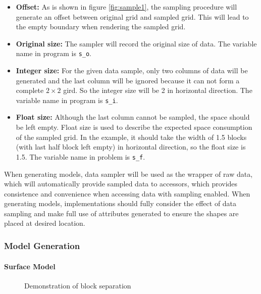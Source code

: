 \begin{itemize}
	\item \textbf{Offset:} As is shown in figure \ref{fig:sample1}, the sampling procedure will generate an offset between original grid and sampled grid. This will lead to the empty boundary when rendering the sampled grid.
	\item \textbf{Original size:} The sampler will record the original size of data. The variable name in program is \lstinline{s_o}.
	\item \textbf{Integer size:} For the given data sample, only two columns of data will be generated and the last column will be ignored because it can not form a complete $2\times2$ gird. So the integer size will be 2 in horizontal direction. The variable name in program is \lstinline{s_i}.
	\item \textbf{Float size:} Although the last column cannot be sampled, the space should be left empty. Float size is used to describe the expected space consumption of the sampled grid. In the example, it should take the width of 1.5 blocks (with last half block left empty) in horizontal direction, so the float size is 1.5. The variable name in problem is \lstinline{s_f}.
\end{itemize}

When generating models, data sampler will be used as the wrapper of raw data, which will automatically provide sampled data to accessors, which provides consistence and convenience when accessing data with sampling enabled. When generating models, implementations should fully consider the effect of data sampling and make full use of attributes generated to ensure the shapes are placed at desired location.

\subsubsection{Model Generation}

\paragraph{Surface Model}

\begin{figure}[!tb]
	\centering
	 \hspace{1.5em}
	\caption{Demonstration of block separation}
	\label{fig:unit}
\end{figure}

